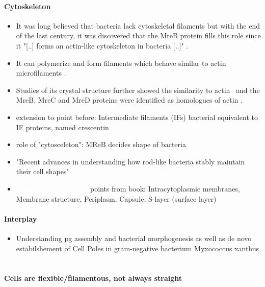 \documentclass{article}
\newcommand{\todo}[1]{\colorbox{WildStrawberry}{\textcolor{white}{#1}}}
\begin{document}
\paragraph{Cytoskeleton}
\begin{itemize}
    \item It was long believed that bacteria lack cytoskeletal filaments but with the end of the last century, it was discovered that the MreB protein fills this role since it "[..] forms an actin-like cytoskeleton in bacteria [..]" \cite{Erickson2001}.
    \item It can polymerize and form filaments which behave similar to actin microfilaments \cite{Dersch2020}.
    \item Studies of its crystal structure further showed the similarity to actin~\cite{vandenEnt2001} and the MreB, MreC and MreD proteins were identified as homologues of actin \cite{Lowe2017_lj}.
    \item \cite{Ausmees2003} extension to point before: Intermediate filaments (IFs) bacterial equivalent to IF proteins, named crescentin
    \item \cite{Bratton2018} role of "cytosceleton": MReB decides shape of bacteria
    \item \cite{vanTeeffelen2018} "Recent advances in understanding how rod-like bacteria stably maintain their cell shapes" \todo{@Toqi what can we learn from this citation?}
    \item \cite{Shi2018} \todo{remove this when done} points from book: Intracytoplasmic membranes,
        Membrane structure, Periplasm, Capsule, S-layer (surface layer)
\end{itemize}
\paragraph{Interplay}
\begin{itemize}
    \item \cite{Huan2021} Understanding \ac{pg} assembly and bacterial morphogenesis as well as de novo estabilshement of Cell Poles in gram-negative bacterium Myxococcus xanthus \todo{sort this somewhere}
\end{itemize}

\paragraph{Cells are flexible/filamentous, not always straight}
\end{document}
